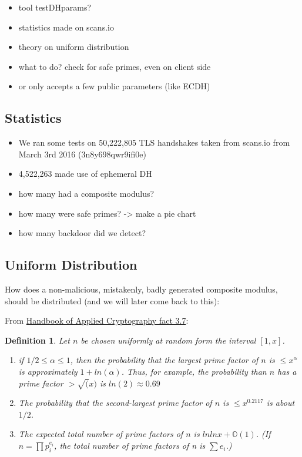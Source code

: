 \documentclass[a4paper,11pt,twocolumn]{article}
\newtheorem{definition}{Definition}
\begin{document}
\begin{itemize}
    \item tool testDHparams?
    \item statistics made on scans.io
    \item theory on uniform distribution
    \item what to do? check for safe primes, even on client side
    \item or only accepts a few public parameters (like ECDH)
\end{itemize}

\subsection{Statistics}

\begin{itemize}
    \item We ran some tests on 50,222,805 TLS handshakes taken from scans.io from March 3rd 2016 (3n8y698qwr9ifi0e)
    \item 4,522,263 made use of ephemeral DH
    \item how many had a composite modulus?
    \item how many were safe primes? -> make a pie chart
    \item how many backdoor did we detect?
\end{itemize}

\subsection{Uniform Distribution}

How does a non-malicious, mistakenly, badly generated composite modulus, should be distributed (and we will later come back to this):

From \href{http://cacr.uwaterloo.ca/hac/about/chap3.pdf}{Handbook of Applied Cryptography fact 3.7}:

\begin{definition}
    Let $n$ be chosen uniformly at random form the interval $[1, x]$.
    \begin{enumerate}
        \item if $1/2 \leq \alpha \leq 1$, then the probability that the largest prime factor of $n$ is $\leq x^{\alpha}$ is approximately $1+ ln(\alpha)$. Thus, for example, the probability than $n$ has a prime factor $> \sqrt(x)$ is $ln(2) \approx 0.69$
        \item The probability that the second-largest prime factor of $n$ is $\leq x^{0.2117}$ is about $1/2$. 
        \item The expected total number of prime factors of $n$ is $ln ln x + \mathbb{O}(1)$. (If $n = \prod p_i^{e_i}$, the total number of prime factors of n is $\sum e_i$.)
    \end{enumerate} 
\end{definition}
\end{document}
